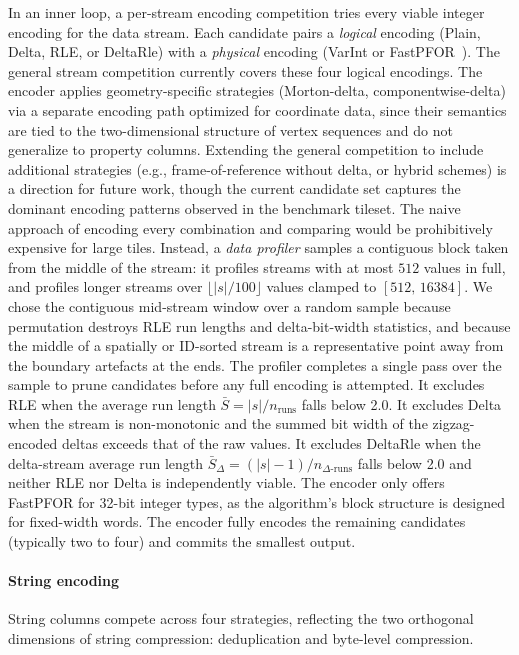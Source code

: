 {In an inner loop, a per-stream encoding competition tries every viable integer encoding for the data stream.
Each candidate pairs a \emph{logical} encoding (Plain, Delta, \ac{RLE}, or DeltaRle) with a \emph{physical} encoding (\ac{VarInt} or \ac{FastPFOR}~\cite{lemireDecodingBillionsIntegers2015}).
The general stream competition currently covers these four logical encodings.
The encoder applies geometry-specific strategies (Morton-delta, componentwise-delta) via a separate encoding path optimized for coordinate data, since their semantics are tied to the two-dimensional structure of vertex sequences and do not generalize to property columns.
Extending the general competition to include additional strategies (e.g., frame-of-reference without delta, or hybrid schemes) is a direction for future work, though the current candidate set captures the dominant encoding patterns observed in the benchmark tileset.
The naive approach of encoding every combination and comparing would be prohibitively expensive for large tiles.
Instead, a \emph{data profiler} samples a contiguous block taken from the middle of the stream: it profiles streams with at most $512$ values in full, and profiles longer streams over $\lfloor |s| / 100 \rfloor$ values clamped to $[512,\, 16384]$.
We chose the contiguous mid-stream window over a random sample because permutation destroys \ac{RLE} run lengths and delta-bit-width statistics, and because the middle of a spatially or ID-sorted stream is a representative point away from the boundary artefacts at the ends.
The profiler completes a single pass over the sample to prune candidates before any full encoding is attempted.
It excludes \ac{RLE} when the average run length $\bar{S} = |s| / n_{\text{runs}}$ falls below 2.0.
It excludes Delta when the stream is non-monotonic and the summed bit width of the zigzag-encoded deltas exceeds that of the raw values.
It excludes DeltaRle when the delta-stream average run length $\bar{S}_\Delta = (|s|-1) / n_{\Delta\text{-runs}}$ falls below 2.0 and neither \ac{RLE} nor Delta is independently viable.
The encoder only offers \ac{FastPFOR} for 32-bit integer types, as the algorithm's block structure is designed for fixed-width words.
The encoder fully encodes the remaining candidates (typically two to four) and commits the smallest output.

\paragraph{String encoding}
String columns compete across four strategies, reflecting the two orthogonal dimensions of string compression: deduplication and byte-level compression.

}

